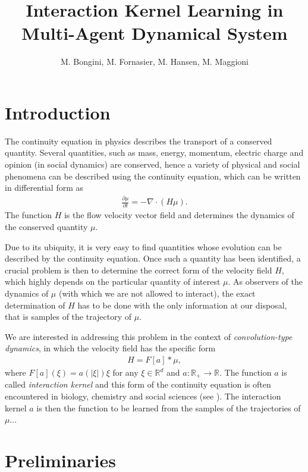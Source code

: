 \documentclass[A4paper,11pt]{article}
\title{Interaction Kernel Learning in Multi-Agent Dynamical System}
\author{M. Bongini, M. Fornasier, M. Hansen, M. Maggioni}
\date{}
\theoremstyle{definition}
\newcommand{\R}{\mathbb{R}}
\begin{document}
\maketitle

\bigskip

\section{Introduction}

The continuity equation in physics describes the transport of a conserved quantity. Several quantities, such as mass, energy, momentum, electric charge and opinion (in social dynamics) are conserved, hence a variety of physical and social phenomena can be described using the continuity equation, which can be written in differential form as
\begin{align*}
\frac{\partial \mu}{\partial t} = -\nabla \cdot (H\mu).
\end{align*}
The function $H$ is the flow velocity vector field and determines the dynamics of the conserved quantity $\mu$.

Due to its ubiquity, it is very easy to find quantities whose evolution can be described by the continuity equation. Once such a quantity has been identified, a crucial problem is then to determine the correct form of the velocity field $H$, which highly depends on the particular quantity of interest $\mu$. As observers of the dynamics of $\mu$ (with which we are not allowed to interact), the exact determination of $H$ has to be done with the only information at our disposal, that is samples of the trajectory of $\mu$.

We are interested in addressing this problem in the context of \textit{convolution-type dynamics}, in which the velocity field has the specific form
\begin{align*}
H = F[a]*\mu,
\end{align*}
where $F[a](\xi) = a(|\xi|)\xi$ for any $\xi \in \R^d$ and $a:\R_+\rightarrow \R$. The function $a$ is called \textit{interaction kernel} and this form of the continuity equation is often encountered in biology, chemistry and social sciences (see \cite{CS,lennard24,reynolds1987flocks,vicsek2012collective}). The interaction kernel $a$ is then the function to be learned from the samples of the trajectories of $\mu$...

\section{Preliminaries}\label{meanfield}
\end{document}
